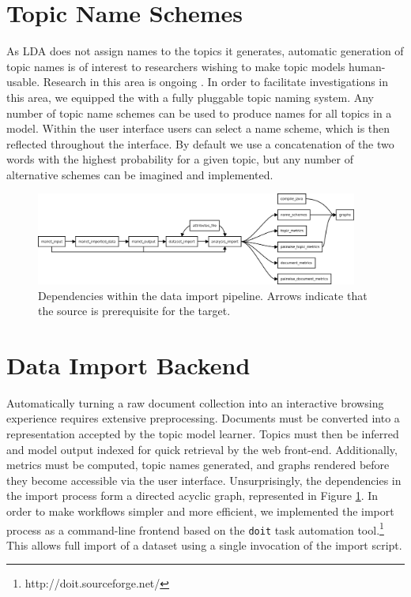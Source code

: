 \documentclass[11pt]{article}
\begin{document}
\section{Topic Name Schemes}
As LDA does not assign names to the topics it generates, automatic generation of
topic names is of interest to researchers wishing to make topic models
human-usable. Research in this area is ongoing \cite{Mei2007,Lau2010}. In order to
facilitate investigations in this area, we equipped the \tool{} with a
fully pluggable topic naming system. Any number of topic name schemes can be
used to produce names for all topics in a model. Within the user interface
users can select a name scheme, which is then reflected throughout the
interface. By default we use a concatenation of the two
words with the highest probability for a given topic, but any number of
alternative schemes can be imagined and implemented.%

\begin{figure}[ht]
 \centering
 \includegraphics[width=400px,keepaspectratio=true]{./build_flowchart.png}
 \caption{Dependencies within the data import pipeline. Arrows indicate that the source is prerequisite for the target.}
 \label{fig:build_flowchart}
\end{figure}
\section{Data Import Backend}
Automatically turning a raw document collection into an interactive browsing
experience requires extensive preprocessing. Documents must be converted into a
representation accepted by the topic model learner. Topics must then be inferred
and model output indexed for quick retrieval by the web front-end.
Additionally, metrics must be computed, topic names generated, and graphs rendered
before they become accessible via the user interface. Unsurprisingly, the dependencies
in the import process form a directed acyclic graph, represented in Figure \ref{fig:build_flowchart}.
In order to make workflows simpler and more efficient, we implemented
the import process as a command-line frontend based on the \texttt{doit}
task automation tool.\footnote{http://doit.sourceforge.net/} This allows full
import of a dataset using a single invocation of the import script.
\end{document}
